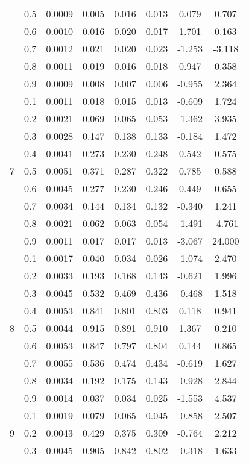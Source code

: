\documentclass[11pt,a4paper]{report}
\begin{document}
\begin{longtable}{ | c | c || c | c | c | c | c | c | }
 & 0.5 & 0.0009 & 0.005 & 0.016 & 0.013 & 0.079 & 0.707 \\
 & 0.6 & 0.0010 & 0.016 & 0.020 & 0.017 & 1.701 & 0.163 \\
 & 0.7 & 0.0012 & 0.021 & 0.020 & 0.023 & -1.253 & -3.118 \\
 & 0.8 & 0.0011 & 0.019 & 0.016 & 0.018 & 0.947 & 0.358 \\
 & 0.9 & 0.0009 & 0.008 & 0.007 & 0.006 & -0.955 & 2.364 \\
 \hline
\multirow{9}{*}{7} & 0.1 & 0.0011 & 0.018 & 0.015 & 0.013 & -0.609 & 1.724 \\
 & 0.2 & 0.0021 & 0.069 & 0.065 & 0.053 & -1.362 & 3.935 \\
 & 0.3 & 0.0028 & 0.147 & 0.138 & 0.133 & -0.184 & 1.472 \\
 & 0.4 & 0.0041 & 0.273 & 0.230 & 0.248 & 0.542 & 0.575 \\
 & 0.5 & 0.0051 & 0.371 & 0.287 & 0.322 & 0.785 & 0.588 \\
 & 0.6 & 0.0045 & 0.277 & 0.230 & 0.246 & 0.449 & 0.655 \\
 & 0.7 & 0.0034 & 0.144 & 0.134 & 0.132 & -0.340 & 1.241 \\
 & 0.8 & 0.0021 & 0.062 & 0.063 & 0.054 & -1.491 & -4.761 \\
 & 0.9 & 0.0011 & 0.017 & 0.017 & 0.013 & -3.067 & 24.000 \\
 \hline
\multirow{9}{*}{8} & 0.1 & 0.0017 & 0.040 & 0.034 & 0.026 & -1.074 & 2.470 \\
 & 0.2 & 0.0033 & 0.193 & 0.168 & 0.143 & -0.621 & 1.996 \\
 & 0.3 & 0.0045 & 0.532 & 0.469 & 0.436 & -0.468 & 1.518 \\
 & 0.4 & 0.0053 & 0.841 & 0.801 & 0.803 & 0.118 & 0.941 \\
 & 0.5 & 0.0044 & 0.915 & 0.891 & 0.910 & 1.367 & 0.210 \\
 & 0.6 & 0.0053 & 0.847 & 0.797 & 0.804 & 0.144 & 0.865 \\
 & 0.7 & 0.0055 & 0.536 & 0.474 & 0.434 & -0.619 & 1.627 \\
 & 0.8 & 0.0034 & 0.192 & 0.175 & 0.143 & -0.928 & 2.844 \\
 & 0.9 & 0.0014 & 0.037 & 0.034 & 0.025 & -1.553 & 4.537 \\
 \hline
\multirow{9}{*}{9} & 0.1 & 0.0019 & 0.079 & 0.065 & 0.045 & -0.858 & 2.507 \\
 & 0.2 & 0.0043 & 0.429 & 0.375 & 0.309 & -0.764 & 2.212 \\
 & 0.3 & 0.0045 & 0.905 & 0.842 & 0.802 & -0.318 & 1.633 \\

\end{longtable}
\end{document}
